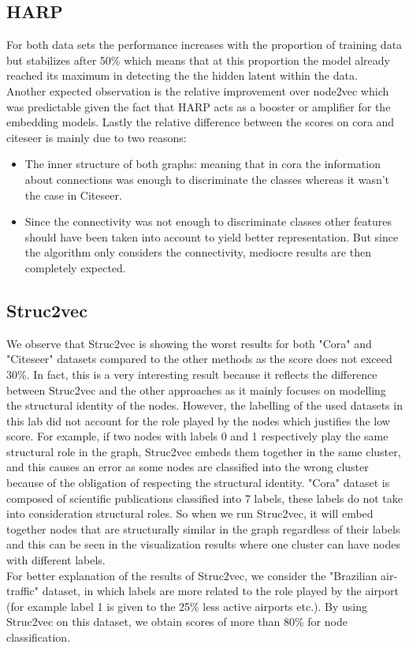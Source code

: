\documentclass[a4paper,13pt]{article}
\begin{document}
\subsection{\textbf{HARP}} For both data sets the performance increases with the proportion of training data but stabilizes after 50\% which means that at this proportion the model already reached its maximum in detecting the  the hidden latent within the data. 
\\
Another expected observation is the relative  improvement over node2vec which was predictable given the fact that HARP acts as a booster or amplifier for the embedding models.  
Lastly the relative difference between the scores on cora and citeseer is mainly due to two reasons:
\begin{itemize}
    \item The inner structure of both graphs: meaning that in cora the information about connections was enough to discriminate the classes whereas it wasn't the case in Citeseer.
    \item Since the connectivity was not enough to discriminate classes other features should have been taken into account to yield better representation. But since the algorithm only considers the connectivity, mediocre results are then completely expected.
\end{itemize}
\subsection{\textbf{Struc2vec}}
 We observe that Struc2vec is showing the worst results for both "Cora" and "Citeseer" datasets compared to the other methods as the score does not exceed 30\%. In fact, this is a very interesting result because it reflects the difference between Struc2vec and the other approaches as it mainly focuses on modelling the structural identity of the nodes. However, the labelling of the used datasets in this lab did not account for the role played by the nodes which justifies the low score. For example, if two nodes with labels 0 and 1 respectively play the same structural role in the graph, Struc2vec embeds them together in the same cluster, and this causes an error as some nodes are classified into the wrong cluster because of the obligation of respecting the structural identity. "Cora" dataset is composed of scientific publications classified into 7 labels, these labels do not take into consideration structural roles. So when we run Struc2vec, it will embed together nodes that are structurally similar in the graph regardless of their labels and this can be seen in the visualization results where one cluster can have nodes with different labels. \\
For better explanation of the results of Struc2vec, we consider the "Brazilian air-traffic" dataset, in which labels are more related to the role played by the airport (for example label 1 is given to the 25\% less active airports etc.). By using Struc2vec on this dataset, we obtain scores of more than 80\% for node classification.
\end{document}
